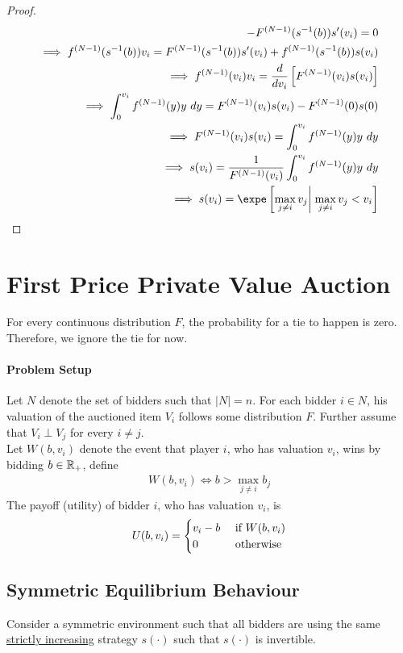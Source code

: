 \documentclass{article}
\begin{document}
\begin{proof}
\begin{align}
			- F^{(N-1)}(s^{-1}(b)) s'(v_i) = 0 \\
			\implies f^{(N-1)}(s^{-1}(b)) v_i = F^{(N-1)}(s^{-1}(b)) s'(v_i) + f^{(N-1)}(s^{-1}(b)) s(v_i) \\
			\implies f^{(N-1)}(v_i) v_i = \frac{d}{dv_i} \left[ F^{(N-1)}(v_i) s(v_i) \right] \\
			\implies \int_{0}^{v_i} f^{(N-1)}(y) y\ dy = F^{(N-1)}(v_i) s(v_i) - F^{(N-1)}(0) s(0) \\
			\implies F^{(N-1)}(v_i) s(v_i) = \int_{0}^{v_i} f^{(N-1)}(y) y\ dy \\
			\implies s(v_i) = \frac{1}{F^{(N-1)}(v_i)} \int_{0}^{v_i} f^{(N-1)}(y) y\ dy \\
			\implies s(v_i) = \expe \left[\max_{j \neq i} v_j \right|\left. \max_{j \neq i} v_j < v_i \right]
		\end{align}
	\end{proof}
	
	\section{First Price Private Value Auction}
	\begin{remark}
		For every continuous distribution $F$, the probability for a tie to happen is zero. Therefore, we ignore the tie for now.
	\end{remark}
	
	\paragraph{Problem Setup} Let $N$ denote the set of bidders such that $|N| = n$. For each bidder $i \in N$, his valuation of the auctioned item $V_i$ follows some distribution $F$. Further assume that $V_i \perp V_j$ for every $i \neq j$. \\
	Let $W(b, v_i)$ denote the event that player $i$, who has valuation $v_i$, wins by bidding $b \in \mathbb{R}_+$, define 
	\begin{align}
		W(b, v_i) \iff b > \max_{j \neq i} b_j
	\end{align}
	The payoff (utility) of bidder $i$, who has valuation $v_i$, is
	\begin{align}
		U(b, v_i) = \begin{cases}
			v_i - b &\text{{ if }} W(b, v_i) \\
			0 &\text{{ otherwise}}
		\end{cases}
	\end{align}
	
	\subsection{Symmetric Equilibrium Behaviour}
	\par Consider a symmetric environment such that all bidders are using the same \ul{strictly increasing} strategy $s(\cdot)$ such that $s(\cdot)$ is invertible.
\end{document}
